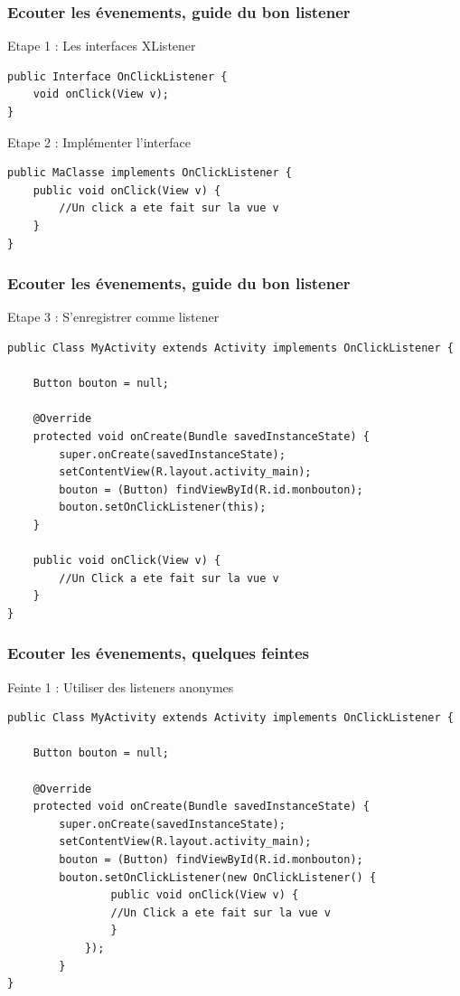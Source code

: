 \documentclass{beamer}
\begin{document}
\begin{frame}[fragile]
\frametitle{Ecouter les évenements, guide du bon listener}
Etape 1 : Les interfaces XListener
\begin{lstlisting}
public Interface OnClickListener {
    void onClick(View v);
}
\end{lstlisting}
Etape 2 : Implémenter l'interface
\begin{lstlisting}
public MaClasse implements OnClickListener {
    public void onClick(View v) {
        //Un click a ete fait sur la vue v
    }
}
\end{lstlisting}
\end{frame}
\begin{frame}[fragile]
\frametitle{Ecouter les évenements, guide du bon listener}
Etape 3 : S'enregistrer comme listener
\begin{lstlisting}
public Class MyActivity extends Activity implements OnClickListener {

    Button bouton = null;

    @Override
    protected void onCreate(Bundle savedInstanceState) {
        super.onCreate(savedInstanceState);
        setContentView(R.layout.activity_main);
        bouton = (Button) findViewById(R.id.monbouton);
        bouton.setOnClickListener(this);
    }
	
    public void onClick(View v) {
        //Un Click a ete fait sur la vue v
    }
}
\end{lstlisting}
\end{frame}
\begin{frame}[fragile]
\frametitle{Ecouter les évenements, quelques feintes}
Feinte 1 : Utiliser des listeners anonymes
\begin{lstlisting}
public Class MyActivity extends Activity implements OnClickListener {

    Button bouton = null;

    @Override
    protected void onCreate(Bundle savedInstanceState) {
        super.onCreate(savedInstanceState);
        setContentView(R.layout.activity_main);
        bouton = (Button) findViewById(R.id.monbouton);
        bouton.setOnClickListener(new OnClickListener() {
                public void onClick(View v) {
                //Un Click a ete fait sur la vue v
                }
            });
	    }
}
\end{lstlisting}
\end{frame}
\end{document}
